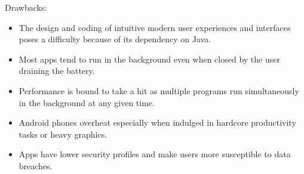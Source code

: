 \documentclass[11pt,a4paper,twoside]{article}
\begin{document}
Drawbacks:
\begin{itemize}
    \item The design and coding of intuitive modern user experiences and interfaces poses a difficulty because of its dependency on Java.
\item Most apps tend to run in the background even when closed by the user draining the battery.
\item Performance is bound to take a hit as multiple programs run simultaneously in the background at any given time.
\item Android phones overheat especially when indulged in hardcore productivity tasks or heavy graphics.
\item Apps have lower security profiles and make users more susceptible to data breaches.
\end{itemize}
\end{document}
